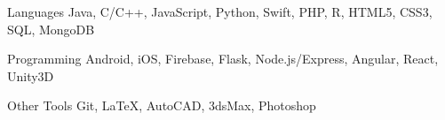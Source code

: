 

\begin{cvskills}

  \cvskill
    {Languages} %
    {Java, C/C++, JavaScript, Python, Swift, PHP, R, HTML5, CSS3, SQL, MongoDB} %

  \cvskill
    {Programming} %
    {Android, iOS, Firebase, Flask, Node.js/Express, Angular, React, Unity3D} %

  \cvskill
    {Other Tools} %
    {Git, \LaTeX, AutoCAD, 3dsMax, Photoshop} %

\end{cvskills}

